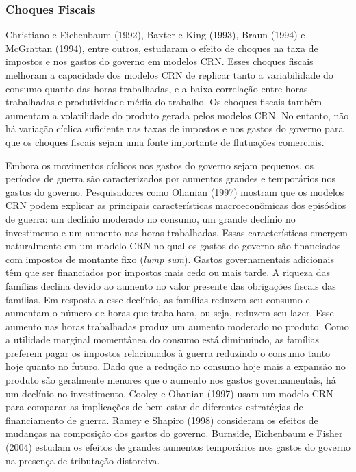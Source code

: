 \documentclass[12pt]{article}
\begin{document}
\subsubsection*{Choques Fiscais}

Christiano e Eichenbaum (1992), Baxter e King (1993), Braun (1994) e McGrattan (1994), entre outros, estudaram o efeito de choques na taxa de impostos e nos gastos do governo em modelos CRN. Esses choques fiscais melhoram a capacidade dos modelos CRN de replicar tanto a variabilidade do consumo quanto das horas trabalhadas, e a baixa correlação entre horas trabalhadas e produtividade média do trabalho. Os choques fiscais também aumentam a volatilidade do produto gerada pelos modelos CRN. No entanto, não há variação cíclica suficiente nas taxas de impostos e nos gastos do governo para que os choques fiscais sejam uma fonte importante de flutuações comerciais.

Embora os movimentos cíclicos nos gastos do governo sejam pequenos, os períodos de guerra são caracterizados por aumentos grandes e temporários nos gastos do governo. Pesquisadores como Ohanian (1997) mostram que os modelos CRN podem explicar as principais características macroeconômicas dos episódios de guerra: um declínio moderado no consumo, um grande declínio no investimento e um aumento nas horas trabalhadas. Essas características emergem naturalmente em um modelo CRN no qual os gastos do governo são financiados com impostos de montante fixo (\textit{lump sum}). Gastos governamentais adicionais têm que ser financiados por impostos mais cedo ou mais tarde. A riqueza das famílias declina devido ao aumento no valor presente das obrigações fiscais das famílias. Em resposta a esse declínio, as famílias reduzem seu consumo e aumentam o número de horas que trabalham, ou seja, reduzem seu lazer. Esse aumento nas horas trabalhadas produz um aumento moderado no produto. Como a utilidade marginal momentânea do consumo está diminuindo, as famílias preferem pagar os impostos relacionados à guerra reduzindo o consumo tanto hoje quanto no futuro. Dado que a redução no consumo hoje mais a expansão no produto são geralmente menores que o aumento nos gastos governamentais, há um declínio no investimento. Cooley e Ohanian (1997) usam um modelo CRN para comparar as implicações de bem-estar de diferentes estratégias de financiamento de guerra. Ramey e Shapiro (1998) consideram os efeitos de mudanças na composição dos gastos do governo. Burnside, Eichenbaum e Fisher (2004) estudam os efeitos de grandes aumentos temporários nos gastos do governo na presença de tributação distorciva.
\end{document}
